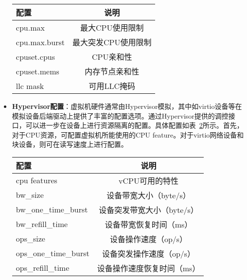 \begin{itemize}
\begin{table}[H]
    \label{tab:cz_cgroup_config}
    \footnotesize%
    \setlength{\tabcolsep}{30pt}%
    \renewcommand{\arraystretch}{1.25}%
    \centering
    \begin{tabular}{lc}
        \hline
        配置 & 说明\\
        \hline
        cpu.max & 最大CPU使用限制 \\
        cpu.max.burst & 最大突发CPU使用限制 \\
        cpuset.cpus & CPU亲和性 \\
        cpuset.mems & 内存节点亲和性 \\
        llc mask& 可用LLC掩码 \\
        \hline
    \end{tabular}
\end{table}

    \item \textbf{Hypervisor配置}：虚拟机硬件通常由Hypervisor模拟，其中如virtio设备等在模拟设备后端驱动上提供了丰富的配置选项。通过Hypervisor提供的调控接口，可以进一步在设备上进行资源隔离的配置。具体配置如表~\ref{tab:cz_hv_config}所示。首先，对于CPU资源，可配置虚拟机所能使用的CPU feature。对于virtio网络设备和块设备，则可在读写速度上进行配置。

\begin{table}[H]
    \label{tab:cz_hv_config}
    \footnotesize%
    \setlength{\tabcolsep}{30pt}%
    \renewcommand{\arraystretch}{1.25}%
    \centering
    \begin{tabular}{lc}
        \hline
        配置 & 说明\\
        \hline
        cpu features& vCPU可用的特性\\
        bw\_size & 设备带宽大小（byte/s）\\
        bw\_one\_time\_burst & 设备突发带宽大小（byte/s）\\
        bw\_refill\_time & 设备带宽恢复时间（ms）\\
        ops\_size & 设备操作速度（op/s）\\
        ops\_one\_time\_burst & 设备突发操作速度（op/s）\\
        ops\_refill\_time & 设备操作速度恢复时间（ms）\\
        \hline
    \end{tabular}
\end{table}

\end{itemize}

